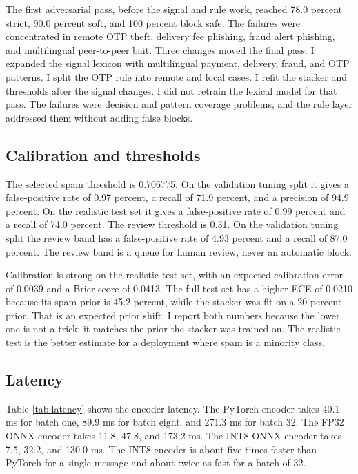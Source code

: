\documentclass[11pt]{article}
\begin{document}
The first adversarial pass, before the signal and rule work, reached 78.0 percent strict, 90.0 percent soft, and 100 percent block safe. The failures were concentrated in remote OTP theft, delivery fee phishing, fraud alert phishing, and multilingual peer-to-peer bait. Three changes moved the final pass. I expanded the signal lexicon with multilingual payment, delivery, fraud, and OTP patterns. I split the OTP rule into remote and local cases. I refit the stacker and thresholds after the signal changes. I did not retrain the lexical model for that pass. The failures were decision and pattern coverage problems, and the rule layer addressed them without adding false blocks.

\subsection{Calibration and thresholds}

The selected spam threshold is 0.706775. On the validation tuning split it gives a false-positive rate of 0.97 percent, a recall of 71.9 percent, and a precision of 94.9 percent. On the realistic test set it gives a false-positive rate of 0.99 percent and a recall of 74.0 percent. The review threshold is 0.31. On the validation tuning split the review band has a false-positive rate of 4.93 percent and a recall of 87.0 percent. The review band is a queue for human review, never an automatic block.

Calibration is strong on the realistic test set, with an expected calibration error of 0.0039 and a Brier score of 0.0413. The full test set has a higher ECE of 0.0210 because its spam prior is 45.2 percent, while the stacker was fit on a 20 percent prior. That is an expected prior shift. I report both numbers because the lower one is not a trick; it matches the prior the stacker was trained on. The realistic test is the better estimate for a deployment where spam is a minority class.

\subsection{Latency}

Table \ref{tab:latency} shows the encoder latency. The PyTorch encoder takes 40.1 ms for batch one, 89.9 ms for batch eight, and 271.3 ms for batch 32. The FP32 ONNX encoder takes 11.8, 47.8, and 173.2 ms. The INT8 ONNX encoder takes 7.5, 32.2, and 130.0 ms. The INT8 encoder is about five times faster than PyTorch for a single message and about twice as fast for a batch of 32.
\end{document}
